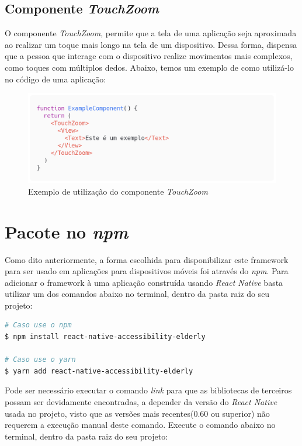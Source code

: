 \documentclass[
	12pt,				    %
	openright,			    %
	oneside,			    %
	a4paper,			    %
    sumario=tradicional,    %
	english,			    %
	brazil,				    %
	]{abntex2}              %
\begin{document}
\subsection{Componente \textit{TouchZoom}}

O componente \textit{TouchZoom}, permite que a tela de uma aplicação seja aproximada ao realizar um toque mais longo na tela de um dispositivo. Dessa forma, dispensa que a pessoa que interage com o dispositivo realize movimentos mais complexos, como toques com múltiplos dedos. Abaixo, temos um exemplo de como utilizá-lo no código de uma aplicação:

\begin{figure}[H]
	\begin{center}
		\includegraphics[width=.8\linewidth]{images/TouchZoom.png}
		\caption[Componente \textit{TouchZoom}]{Exemplo de utilização do componente \textit{TouchZoom}}
		\label{fig:touchZoomExample}
	\end{center}
\end{figure}


\section{Pacote no \textit{npm}}

Como dito anteriormente, a forma escolhida para disponibilizar este framework para ser usado em aplicações para dispositivos móveis foi através do \textit{npm}. Para adicionar o framework à uma aplicação construída usando \textit{React Native} basta utilizar um dos comandos abaixo no terminal, dentro da pasta raiz do seu projeto:

\begin{lstlisting}[language=bash]
# Caso use o npm
$ npm install react-native-accessibility-elderly

# Caso use o yarn
$ yarn add react-native-accessibility-elderly
\end{lstlisting}

Pode ser necessário executar o comando \textit{link} para que as bibliotecas de terceiros possam ser devidamente encontradas, a depender da versão do \textit{React Native} usada no projeto, visto que as versões mais recentes(0.60 ou superior) não requerem a execução manual deste comando. Execute o comando abaixo no terminal, dentro da pasta raiz do seu projeto:
\end{document}

